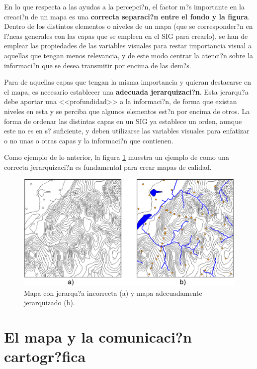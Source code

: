 En lo que respecta a las ayudas a la percepci?n, el factor m?s importante en la creaci?n de un mapa es una \textbf{correcta separaci?n entre el fondo y la figura}. Dentro de los distintos elementos o niveles de un mapa (que se corresponder?n en l?neas generales con las capas que se empleen en el SIG para crearlo), se han de emplear las propiedades de las variables visuales para restar importancia visual a aquellas que tengan menos relevancia, y de este modo centrar la atenci?n sobre la informaci?n que se desea transmitir por encima de las dem?s.

Para de aquellas capas que tengan la misma importancia y quieran destacarse en el mapa, es necesario establecer una \textbf{adecuada jerarquizaci?n}. Esta jerarqu?a debe aportar una <<profundidad>> a la informaci?n, de forma que existan niveles en esta y se perciba que algunos elementos est?n por encima de otros. La forma de ordenar las distintas capas en un SIG ya establece un orden, aunque este no es en s? suficiente, y deben utilizarse las variables visuales para enfatizar o no unas o otras capas y la informaci?n que contienen.

Como ejemplo de lo anterior, la figura \ref{Fig:JerarquiaMapa} muestra un ejemplo de como una correcta jerarquizaci?n es fundamental para crear mapas de calidad.

\begin{figure}[!hbt]
\centering
\includegraphics[width=\columnwidth]{../es/Visualizacion/JerarquiaMapa.png}
\caption{\small Mapa con jerarqu?a incorrecta (a) y mapa adecuadamente jerarquizado (b).}
\label{Fig:JerarquiaMapa} 
\end{figure}


\section{El mapa y la comunicaci?n cartogr?fica}

